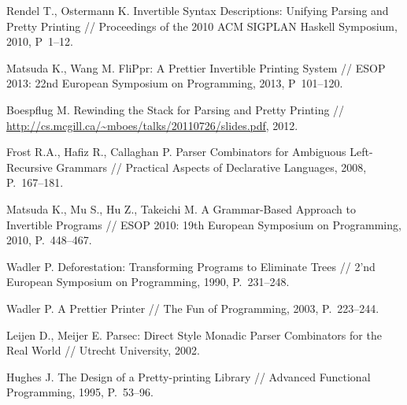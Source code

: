 \begin{thebibliography}{99}
  Rendel T., Ostermann K. Invertible Syntax Descriptions: Unifying Parsing and Pretty Printing //
  Proceedings of the 2010 ACM SIGPLAN Haskell Symposium, 2010, P~1--12.

  Matsuda K., Wang M. FliPpr: A Prettier Invertible Printing System //
  ESOP 2013: 22nd European Symposium on Programming, 2013, P~101--120.

  Boespflug M. Rewinding the Stack for Parsing and Pretty Printing // 
  \url{http://cs.mcgill.ca/~mboes/talks/20110726/slides.pdf}, 2012.

  Frost R.A., Hafiz R., Callaghan P.
  Parser Combinators for Ambiguous Left-Recursive Grammars // 
  Practical Aspects of Declarative Languages, 2008, P.~167--181.

  Matsuda K., Mu S., Hu Z., Takeichi M.
  A Grammar-Based Approach to Invertible Programs //
  ESOP 2010: 19th European Symposium on Programming, 2010, P.~448--467.

  Wadler P. Deforestation: Transforming Programs to Eliminate Trees //
  2'nd European Symposium on Programming, 1990, P.~231--248.

  Wadler P. A Prettier Printer // The Fun of Programming, 2003, P.~223--244.

  Leijen D., Meijer E.
  Parsec: Direct Style Monadic Parser Combinators for the Real World //
  Utrecht University, 2002.

  Hughes J. The Design of a Pretty-printing Library // Advanced Functional Programming,
  1995, P.~53--96.

\end{thebibliography}
